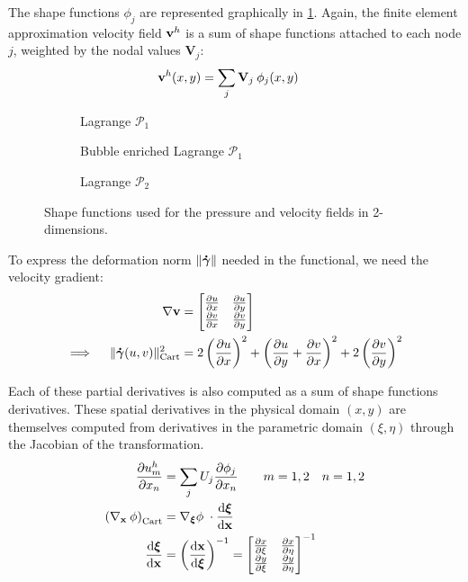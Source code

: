 \documentclass[11 pt]{report}
\begin{document}
The shape functions $\phi_j$ are represented graphically in \cref{fig:shape_functions_2d}. Again, the finite element approximation velocity field $\mathbf{v}^h$ is a sum of shape functions attached to each node $j$, weighted by the nodal values $\mathbf{V}_j$:
\begin{align}
    \mathbf{v}^h(x, y) &= \sum_{j} \mathbf{V}_j \: \phi_j(x, y)
\end{align}

\begin{figure}[t]
    \centering
    \begin{subfigure}[t]{0.495\textwidth}
        
        \caption{Lagrange $\mathcal{P}_1$}
    \end{subfigure}
    \begin{subfigure}[t]{0.495\textwidth}
        
        \caption{Bubble enriched Lagrange $\mathcal{P}_1$}
    \end{subfigure}
    \begin{subfigure}[b]{\textwidth}
        
        \caption{Lagrange $\mathcal{P}_2$}
    \end{subfigure}
    \caption{Shape functions used for the pressure and velocity fields in 2-dimensions.}
    \label{fig:shape_functions_2d}
\end{figure} 

To express the deformation norm $\|\boldsymbol{\dot \gamma}\|$ needed in the functional, we need the velocity gradient:
\begin{align}
    \nabla \mathbf{v} &= 
    \begin{bmatrix}
        \pdv{u}{x} & \pdv{u}{y}\\
        \pdv{v}{x} & \pdv{v}{y}\\
    \end{bmatrix}\\
    \implies \quad \|\boldsymbol{\dot \gamma}(u, v)\|_{\text{Cart}}^2 &= 2 \left(\pdv{u}{x}\right)^2 + \left(\pdv{u}{y} + \pdv{v}{x}\right)^2 + 2\left(\pdv{v}{y}\right)^2
\end{align}

Each of these partial derivatives is also computed as a sum of shape functions derivatives. These spatial derivatives in the physical domain $(x,y)$ are themselves computed from derivatives in the parametric domain $(\xi, \eta)$ through the Jacobian of the transformation.
\begin{align}
    \pdv{u^h_m}{x_n} &= \sum_j U_j \pdv{\phi_j}{x_n} \qquad m=1,2 \quad n=1,2\\
    \left(\nabla_{\mathbf{x}} \: \phi\right)_{\text{Cart}} &= \nabla_{\boldsymbol\xi} \phi \; \cdot \dv{\boldsymbol \xi}{\mathbf{x}}\\
    \dv{\boldsymbol \xi}{\mathbf{x}} &= \left(\dv{\mathbf{x}}{\boldsymbol \xi}\right)^{-1} = 
    \begin{bmatrix}
        \pdv{x}{\xi} & \pdv{x}{\eta}\\
        \pdv{y}{\xi} & \pdv{y}{\eta}\\
    \end{bmatrix}^{-1}
\end{align}
\end{document}
